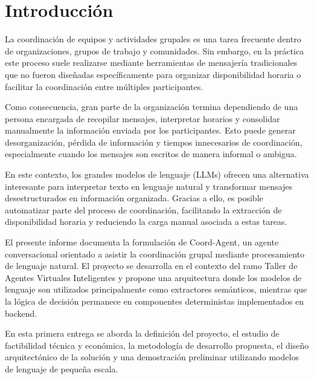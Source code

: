 \section{Introducción} \label{sec:introduccion}

La coordinación de equipos y actividades grupales es una tarea frecuente dentro de organizaciones, grupos de trabajo y comunidades. Sin embargo, en la práctica este proceso suele realizarse mediante herramientas de mensajería tradicionales que no fueron diseñadas específicamente para organizar disponibilidad horaria o facilitar la coordinación entre múltiples participantes.

Como consecuencia, gran parte de la organización termina dependiendo de una persona encargada de recopilar mensajes, interpretar horarios y consolidar manualmente la información enviada por los participantes. Esto puede generar desorganización, pérdida de información y tiempos innecesarios de coordinación, especialmente cuando los mensajes son escritos de manera informal o ambigua.

En este contexto, los grandes modelos de lenguaje (LLMs) ofrecen una alternativa interesante para interpretar texto en lenguaje natural y transformar mensajes desestructurados en información organizada. Gracias a ello, es posible automatizar parte del proceso de coordinación, facilitando la extracción de disponibilidad horaria y reduciendo la carga manual asociada a estas tareas.

El presente informe documenta la formulación de Coord-Agent, un agente conversacional orientado a asistir la coordinación grupal mediante procesamiento de lenguaje natural. El proyecto se desarrolla en el contexto del ramo Taller de Agentes Virtuales Inteligentes y propone una arquitectura donde los modelos de lenguaje son utilizados principalmente como extractores semánticos, mientras que la lógica de decisión permanece en componentes deterministas implementados en backend.

En esta primera entrega se aborda la definición del proyecto, el estudio de factibilidad técnica y económica, la metodología de desarrollo propuesta, el diseño arquitectónico de la solución y una demostración preliminar utilizando modelos de lenguaje de pequeña escala.